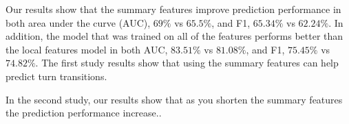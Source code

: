 Our results show that the summary features improve prediction performance in both area under the curve (AUC), $69\%$ vs $65.5\%$, and F1, $65.34\%$ vs $62.24\%$. In addition, the model that was trained on all of the features performs better than the local features model in both AUC, $83.51\%$ vs $81.08\%$, and F1, $75.45\%$ vs $74.82\%$. The first study results show that using the summary features can help predict turn transitions.

In the second study, our results show that as you shorten the summary features the prediction performance increase..
